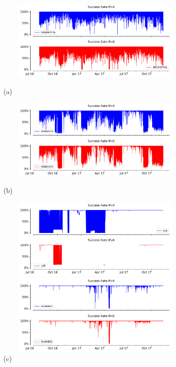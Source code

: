 \begin{figure}[!ht]
	\begin{minipage}{0.5\textwidth}
		\centering
		\includegraphics[keepaspectratio, height=4cm, width=10cm]{figures/success/netflix-success-rate-timeseries-network-type-resd.pdf}
		\caption[Timeseries of Success rate over IPv4 and IPv6 as per Residential Probes]{(a)}
	\end{minipage}
	\begin{minipage}{0.5\textwidth}
		\centering
		\includegraphics[keepaspectratio, height=4cm, width=10cm]{figures/success/netflix-success-rate-timeseries-network-type-nren.pdf}
		\caption[Timeseries of Success rate over IPv4 and IPv6 as per Research Probes]{(b)}
	\end{minipage}
	\begin{minipage}{0.5\textwidth}
		\centering
		\includegraphics[keepaspectratio, height=4cm, width=10cm]{figures/success/netflix-success-rate-timeseries-network-type-lab.pdf}
		\caption[Timeseries of Success rate over IPv4 and IPv6 as per Lab Probes]{(c)}
	\end{minipage}
	\begin{minipage}{0.5\textwidth}
		\centering
		\includegraphics[keepaspectratio, height=4cm, width=10cm]{figures/success/netflix-success-rate-timeseries-network-type-bus.pdf}

\end{minipage}
\end{figure}
